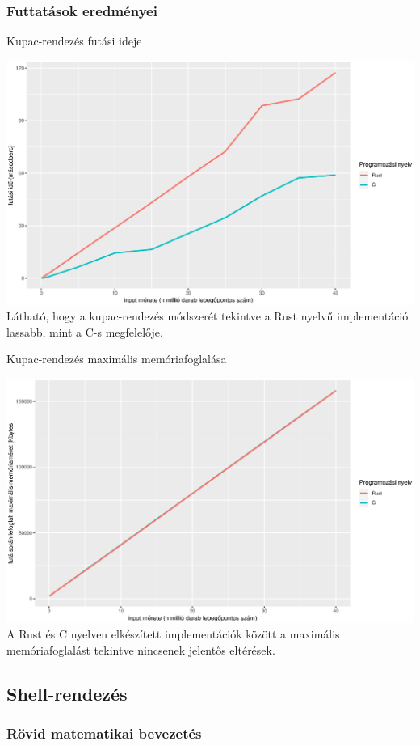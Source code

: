 \subsubsection{Futtatások eredményei}
Kupac-rendezés futási ideje

\includegraphics[width=15.5cm]{kepek/heap_run.eps}
Látható, hogy a kupac-rendezés módszerét tekintve a Rust nyelvű implementáció lassabb, mint a C-s megfelelője.

Kupac-rendezés maximális memóriafoglalása

\includegraphics[width=15.5cm]{kepek/heap_memory.eps}
A Rust és C nyelven elkészített implementációk között a maximális memóriafoglalást tekintve nincsenek jelentős eltérések.

\subsection{Shell-rendezés}
\subsubsection{Rövid matematikai bevezetés}
